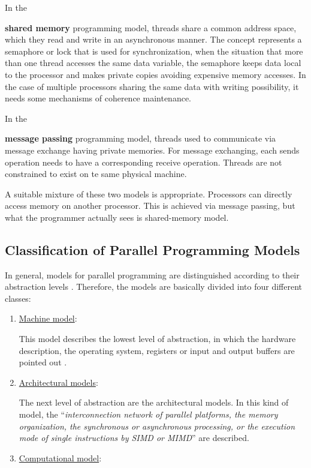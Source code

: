 In the {\textbf{shared memory} programming model, threads share a common address space, which they read and write in an asynchronous manner. The concept represents a semaphore or lock that is used for synchronization, when the situation that more than one thread accesses the same data variable, the semaphore keeps data local to the processor and makes private copies avoiding expensive memory accesses. In the case of multiple processors sharing the same data with writing possibility, it needs some mechanisms of coherence maintenance.
	
In the {\textbf{message passing} programming model, threads used to communicate via message exchange having private memories. For message exchanging, each sends operation needs to have a corresponding receive operation. Threads are not constrained to exist on te same physical machine. 
	
A suitable mixture of these two models is appropriate. Processors can directly access memory on another processor. This is achieved via message passing, but what the programmer actually sees is shared-memory model.

\subsection{Classification of Parallel Programming Models}

In general, models for parallel programming are distinguished according to their abstraction levels \parencite{book1}. Therefore, the models are basically divided into four different classes:

\begin{enumerate}
	\item \underline{Machine model}:
	
	This model describes the lowest level of abstraction, in which the hardware description, the operating system, registers or input and output buffers are pointed out \parencite[see][p105]{book1}. 
	
	\item \underline{Architectural models}:
	
	The next level of abstraction are the architectural models. In this kind of model, the ``\textit{interconnection network of parallel platforms, the memory organization, the synchronous or asynchronous processing, or the execution mode of single instructions by SIMD or MIMD}'' \parencite[see][p105-106]{book1} are described.
	
	\item \underline{Computational model}:
	

\end{enumerate}}}
